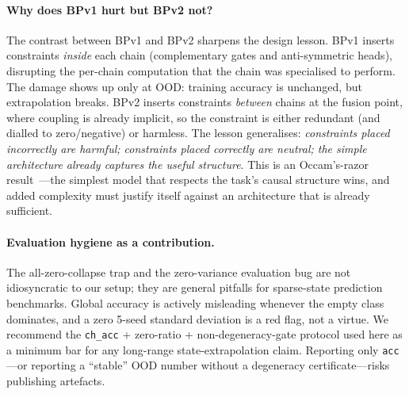 \paragraph{Why does BPv1 hurt but BPv2 not?}
The contrast between BPv1 and BPv2 sharpens the design lesson. BPv1 inserts
constraints \emph{inside} each chain (complementary gates and anti-symmetric
heads), disrupting the per-chain computation that the chain was specialised to
perform. The damage shows up only at OOD: training accuracy is unchanged, but
extrapolation breaks. BPv2 inserts constraints \emph{between} chains at the
fusion point, where coupling is already implicit, so the constraint is either
redundant (and dialled to zero/negative) or harmless. The lesson generalises:
\emph{constraints placed incorrectly are harmful; constraints placed correctly
are neutral; the simple architecture already captures the useful structure}.
This is an Occam's-razor result~\cite{_occams_razor}---the simplest model that
respects the task's causal structure wins, and added complexity must justify
itself against an architecture that is already sufficient.

\paragraph{Evaluation hygiene as a contribution.}
The all-zero-collapse trap and the zero-variance evaluation bug are not
idiosyncratic to our setup; they are general pitfalls for sparse-state
prediction benchmarks. Global accuracy is actively misleading whenever the
empty class dominates, and a zero 5-seed standard deviation is a red flag, not
a virtue. We recommend the \texttt{ch\_acc} + zero-ratio + non-degeneracy-gate
protocol used here as a minimum bar for any long-range state-extrapolation
claim. Reporting only \texttt{acc}---or reporting a ``stable'' OOD number
without a degeneracy certificate---risks publishing artefacts.


